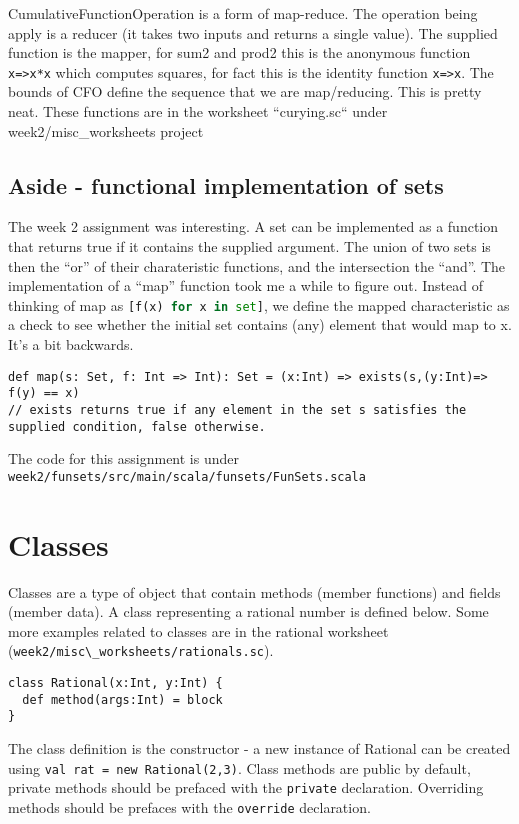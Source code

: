 CumulativeFunctionOperation is a form of map-reduce. The operation being apply is a reducer (it takes two inputs and returns a single value). The supplied function is the mapper, for sum2 and prod2 this is the anonymous function \lstinline|x=>x*x| which computes squares, for fact this is the identity function \lstinline|x=>x|. The bounds of CFO define the sequence that we are map/reducing. This is pretty neat. These functions are in the worksheet ``curying.sc`` under week2/misc\_worksheets project


\section{Aside - functional implementation of sets}
The week 2 assignment was interesting. A set can be implemented as a function that returns true if it contains the supplied argument. The union of two sets is then the ``or'' of their charateristic functions, and the intersection the ``and''. 
The implementation of a ``map'' function took me a while to figure out. Instead of thinking of map as \lstinline[language=Python]|[f(x) for x in set]|, we define the mapped characteristic as a check to see whether the initial set contains (any) element that would map to x. It's a bit backwards. 
\begin{lstlisting}
def map(s: Set, f: Int => Int): Set = (x:Int) => exists(s,(y:Int)=> f(y) == x)
// exists returns true if any element in the set s satisfies the supplied condition, false otherwise.
\end{lstlisting}
The code for this assignment is under \verb|week2/funsets/src/main/scala/funsets/FunSets.scala|

\chapter{Classes}

Classes are a type of object that contain methods (member functions) and fields (member data). A class representing a rational number is defined below. Some more examples related to classes are in the rational worksheet (\verb|week2/misc\_worksheets/rationals.sc|).

\begin{lstlisting}
class Rational(x:Int, y:Int) {
  def method(args:Int) = block
}
\end{lstlisting}

The class definition is the constructor - a new instance of Rational can be created using \lstinline|val rat = new Rational(2,3)|. Class methods are public by default, private methods should be prefaced with the \lstinline|private| declaration. Overriding methods should be prefaces with the  \lstinline|override| declaration.

